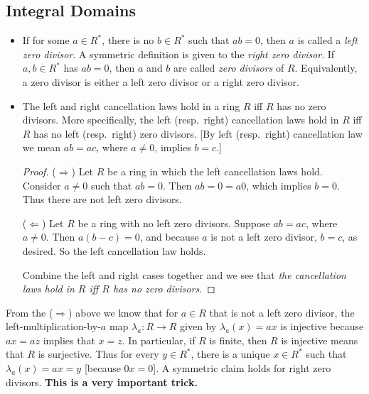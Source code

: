 \documentclass[11pt]{article}
\newcommand{\df}[1]{\textit{\textsf{#1}}}
\renewcommand{\implies}{\Rightarrow}
\renewcommand{\impliedby}{\Leftarrow}
\begin{document}
\subsection{Integral Domains}
\begin{itemize}
    \item If for some $a \in R^*$, there is no $b \in R^*$ such that $ab = 0$, then $a$ is called a \df{left zero divisor}. A symmetric definition is given to the \df{right zero divisor}. If $a,b \in R^*$ has $ab=0$, then $a$ and $b$ are called \df{zero divisors} of $R$. Equivalently, a zero divisor is either a left zero divisor or a right zero divisor.
    \item The left and right cancellation laws hold in a ring $R$ iff $R$ has no zero divisors. More specifically, the left (resp.\ right) cancellation laws hold in $R$ iff $R$ has no left (resp.\ right) zero divisors. [By left (resp.\ right) cancellation law we mean $ab = ac$, where $a \neq 0$, implies $b=c$.]
    \begin{proof}
        ($\implies$) Let $R$ be a ring in which the left cancellation laws hold. Consider $a \neq 0$ such that $ab=0$. Then $ab = 0 = a0$, which implies $b=0$. Thus there are not left zero divisors.

        ($\impliedby$) Let $R$ be a ring with no left zero divisors. Suppose $ab=ac$, where $a \neq 0$. Then $a(b-c)=0$, and because $a$ is not a left zero divisor, $b=c$, as desired. So the left cancellation law holds.

        Combine the left and right cases together and we see that \emph{the cancellation laws hold in $R$ iff $R$ has no zero divisors}.
    \end{proof}
\end{itemize}
\begin{framed}
From the ($\implies$) above we know that for $a \in R$ that is not a left zero divisor, the left-multiplication-by-$a$ map $\lambda_a\colon R \to R$ given by $\lambda_a(x) = ax$ is injective because $ax = az$ implies that $x = z$. In particular, if $R$ is finite, then $R$ is injective means that $R$ is surjective. Thus for every $y \in R^*$, there is a unique $x \in R^*$ such that $\lambda_a(x)=ax=y$ [because $0x=0$]. A symmetric claim holds for right zero divisors. \textbf{This is a very important trick.}
\end{framed}
\end{document}
